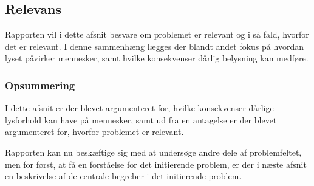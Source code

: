 \subsection{Relevans}
Rapporten vil i dette afsnit besvare om problemet er relevant og i så fald, hvorfor det er relevant. I denne sammenhæng lægges der blandt andet fokus på hvordan lyset påvirker mennesker, samt hvilke konsekvenser dårlig belysning kan medføre. 





\subsubsection*{Opsummering}
I dette afsnit er der blevet argumenteret for, hvilke konsekvenser dårlige lysforhold kan have på mennesker, samt ud fra en antagelse er der blevet argumenteret for, hvorfor problemet er relevant. 

Rapporten kan nu beskæftige sig med at undersøge andre dele af problemfeltet, men for først, at få en forståelse for det initierende problem, er der i næste afsnit en beskrivelse af de centrale begreber i det initierende problem.
